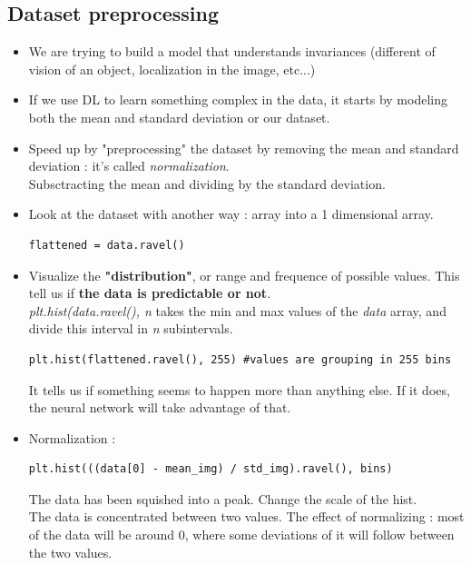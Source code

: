 \documentclass[12pt,a4paper]{article}
\begin{document}
\subsection{Dataset preprocessing}
\begin{itemize}
\item We are trying to build a model that understands invariances (different of vision of an object, localization in the image, etc...)
\item If we use DL to learn something complex in the data, it starts by modeling both the mean and standard deviation or our dataset.
\item Speed up by "preprocessing" the dataset by removing the mean and standard deviation : it's called \textit{normalization}.\\
Subsctracting the mean and dividing by the standard deviation.
\item Look at the dataset with another way : array into a 1 dimensional array.
\begin{lstlisting}
flattened = data.ravel()
\end{lstlisting}
\item Visualize the \textbf{"distribution"}, or range and frequence of possible values. This tell us if \textbf{the data is predictable or not}.\\
\textit{plt.hist(data.ravel(), n} takes the min and max values of the \textit{data} array, and divide this interval in \textit{n} subintervals.
\begin{lstlisting}
plt.hist(flattened.ravel(), 255) #values are grouping in 255 bins
\end{lstlisting}
It tells us if something seems to happen more than anything else. If it does, the neural network will take advantage of that.
\item Normalization :
\begin{lstlisting}
plt.hist(((data[0] - mean_img) / std_img).ravel(), bins)
\end{lstlisting}
The data has been squished into a peak. Change the scale of the hist.\\
The data is concentrated between two values. The effect of normalizing : most of the data will be around 0, where some deviations of it will follow between the two values.\\
\begin{minipage}{\linewidth}
  \begin{figure}[H]
  \centering

\end{figure}
\end{minipage}
\end{itemize}
\end{document}
